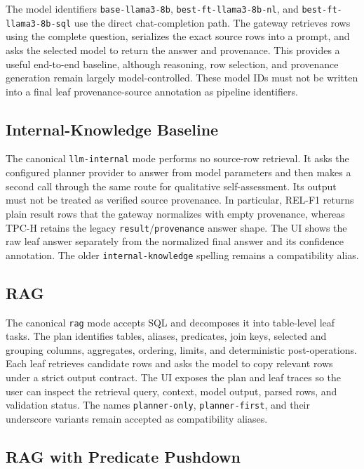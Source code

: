 \documentclass[11pt,a4paper]{article}
\newcommand{\code}[1]{\texttt{#1}}
\begin{document}
The model identifiers \code{base-llama3-8b}, \code{best-ft-llama3-8b-nl}, and
\code{best-ft-llama3-8b-sql} use the direct chat-completion path. The gateway retrieves rows
using the complete question, serializes the exact source rows into a prompt, and
asks the selected model to return the answer and provenance. This provides a
useful end-to-end baseline, although reasoning, row selection, and provenance
generation remain largely model-controlled. These model IDs must not be written
into a final leaf provenance-source annotation as pipeline identifiers.

\subsection{Internal-Knowledge Baseline}

The canonical \code{llm-internal} mode performs no source-row retrieval. It asks
the configured planner provider to answer from model parameters and then makes a
second call through the same route for qualitative self-assessment. Its output
must not be treated as verified source provenance. In particular, REL-F1 returns
plain result rows that the gateway normalizes with empty provenance, whereas
TPC-H retains the legacy \code{result}/\code{provenance} answer shape. The UI
shows the raw leaf answer separately from the normalized final answer and its
confidence annotation. The older \code{internal-knowledge} spelling remains a
compatibility alias.

\subsection{RAG}

The canonical \code{rag} mode accepts SQL and decomposes it into table-level leaf
tasks. The plan identifies tables, aliases, predicates, join keys, selected and
grouping columns, aggregates, ordering, limits, and deterministic post-operations.
Each leaf retrieves candidate rows and asks the model to copy relevant rows under
a strict output contract. The UI exposes the plan and leaf traces so the user can
inspect the retrieval query, context, model output, parsed rows, and validation
status. The names \code{planner-only}, \code{planner-first}, and their underscore
variants remain accepted as compatibility aliases.

\subsection{RAG with Predicate Pushdown}
\end{document}

